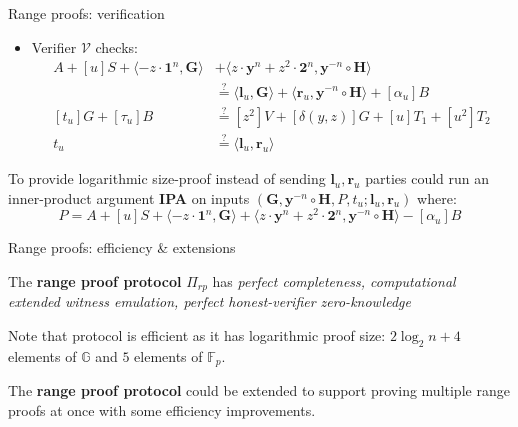 \documentclass{zkdl-presentation-template}
\begin{document}
    \begin{frame}{Range proofs: verification}
        \begin{itemize}
            \item Verifier $\mathcal{V}$ checks:
                \begin{equation*}
                    \begin{aligned}
                        A + [u]S + \langle -z \cdot \mathbf{1}^n, \mathbf{G} \rangle &+ \langle z \cdot \mathbf{y}^n + z^2 \cdot \mathbf{2}^n, \mathbf{y}^{-n} \circ \mathbf{H} \rangle \\
                        &\stackrel{\text{?}}{=} \langle \mathbf{l}_u, \mathbf{G} \rangle + \langle \mathbf{r}_u, \mathbf{y}^{-n} \circ \mathbf{H} \rangle + [\alpha_u]B \\
                        [t_u]G + [\tau_u]B &\stackrel{\text{?}}{=} [z^2]V + [\delta(y,z)]G + [u]T_1 + [u^2]T_2 \\
                        t_u &\stackrel{\text{?}}{=} \langle \mathbf{l}_u, \mathbf{r}_u \rangle
                    \end{aligned}
                \end{equation*}
        \end{itemize}
        \pause
        \begin{remark}
            To provide logarithmic size-proof instead of sending $\mathbf{l}_u, \mathbf{r}_u$ parties could run an inner-product argument \textbf{IPA} on inputs $(\mathbf{G},\mathbf{y}^{-n} \circ \mathbf{H}, P, t_u; \mathbf{l}_u, \mathbf{r}_u)$ where:
            $$P = A + [u]S + \langle -z \cdot \mathbf{1}^n, \mathbf{G} \rangle + \langle z \cdot \mathbf{y}^n + z^2 \cdot \mathbf{2}^n, \mathbf{y}^{-n} \circ \mathbf{H} \rangle - [\alpha_u]B$$
        \end{remark}
    \end{frame}

    \begin{frame}{Range proofs: efficiency \& extensions}
        \begin{theorem}
            The \textbf{range proof protocol} $\Pi_{rp}$ has \textit{perfect completeness, computational extended witness emulation, perfect honest-verifier zero-knowledge}
        \end{theorem}
        \pause
        Note that protocol is efficient as it has logarithmic proof size: $2\log_2 n + 4$ elements of $\mathbb{G}$ and $5$ elements of $\mathbb{F}_p$.
        \pause
        \begin{remark}
            The \textbf{range proof protocol} could be extended to support proving multiple range proofs at once with some efficiency improvements.
        \end{remark}
    \end{frame}
\end{document}
